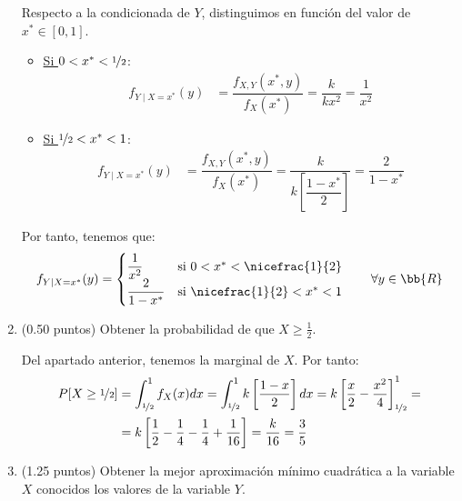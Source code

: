 \documentclass[12pt]{article}
\begin{document}
\begin{ejercicio}[5 puntos]
\begin{enumerate}
            Respecto a la condicionada de $Y$, distinguimos en función del valor de $x^*\in \left[0,1\right]$.
            \begin{itemize}
                \item \ul{Si $0<x^*<\nicefrac{1}{2}$}:
                \begin{align*}
                    f_{Y\mid X=x^*}(y) &= \dfrac{f_{X,Y}(x^*,y)}{f_X(x^*)}
                    = \dfrac{k}{kx^2} = \dfrac{1}{x^2}
                \end{align*}
                \item \ul{Si $\nicefrac{1}{2}<x^*<1$}:
                \begin{align*}
                    f_{Y\mid X=x^*}(y) &= \dfrac{f_{X,Y}(x^*,y)}{f_X(x^*)}
                    = \dfrac{k}{k\left[\dfrac{1-x^*}{2}\right]} = \dfrac{2}{1-x^*}
                \end{align*}
            \end{itemize}

            Por tanto, tenemos que:
            \begin{equation*}
                f_{Y\mid X=x^*}(y) = \begin{cases}
                    \dfrac{1}{x^2} & \text{si } 0<x^*<\nicefrac{1}{2}\\
                    \dfrac{2}{1-x^*} & \text{si } \nicefrac{1}{2}<x^*<1
                \end{cases}
                \qquad \forall y \in \bb{R}
            \end{equation*}

            \item (0.50 puntos) Obtener la probabilidad de que $X \geq \frac{1}{2}$.
            
            Del apartado anterior, tenemos la marginal de $X$. Por tanto:
            \begin{align*}
                P[X \geq \nicefrac{1}{2}] &= \int_{\nicefrac{1}{2}}^{1} f_X(x)dx
                = \int_{\nicefrac{1}{2}}^{1} k\left[\dfrac{1-x}{2}\right]dx
                = k\left[\dfrac{x}{2}-\dfrac{x^2}{4}\right]_{\nicefrac{1}{2}}^{1}
                =\\&= k\left[\dfrac{1}{2}-\dfrac{1}{4}-\dfrac{1}{4}+\dfrac{1}{16}\right]
                = \dfrac{k}{16} = \dfrac{3}{5}
            \end{align*}
            \item (1.25 puntos) Obtener la mejor aproximación mínimo cuadrática a la variable $X$ conocidos los valores de la variable $Y$.\\
            

\end{enumerate}
\end{ejercicio}
\end{document}
